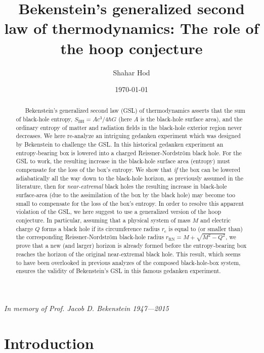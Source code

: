 \documentclass[12pt,preprintnumbers,amsmath,amssymbm,prd]{revtex4-1}
\begin{document}
\title{Bekenstein's generalized second law of thermodynamics: The
role of the hoop conjecture}
\author{Shahar Hod}
\address{The Ruppin Academic Center, Emeq Hefer 40250, Israel}
\address{ }
\address{The Hadassah Institute, Jerusalem 91010, Israel}
\date{\today}
{\it In memory of Prof. Jacob D. Bekenstein 1947---2015}

\begin{abstract}
\ \ \ Bekenstein's generalized second law (GSL) of thermodynamics
asserts that the sum of black-hole entropy,
$S_{\text{BH}}=Ac^3/4\hbar G$ (here $A$ is the black-hole surface
area), and the ordinary entropy of matter and radiation fields in
the black-hole exterior region never decreases. We here re-analyze
an intriguing gedanken experiment which was designed by Bekenstein
to challenge the GSL. In this historical gedanken experiment an
entropy-bearing box is lowered into a charged Reissner-Nordstr\"om
black hole. For the GSL to work, the resulting increase in the
black-hole surface area (entropy) must compensate for the loss of
the box's entropy. We show that {\it if} the box can be lowered
adiabatically all the way down to the black-hole horizon, as
previously assumed in the literature, then for {\it near-extremal}
black holes the resulting increase in black-hole surface-area (due
to the assimilation of the box by the black hole) may become too
small to compensate for the loss of the box's entropy. In order to
resolve this apparent violation of the GSL, we here suggest to use a
generalized version of the hoop conjecture. In particular, assuming
that a physical system of mass $M$ and electric charge $Q$ forms a
black hole if its circumference radius $r_{\text{c}}$ is equal to
(or smaller than) the corresponding Reissner-Nordstr\"om black-hole
radius $r_{\text{RN}}=M+\sqrt{M^2-Q^2}$, we prove that a new (and
larger) horizon is already formed before the entropy-bearing box
reaches the horizon of the original near-extremal black hole. This
result, which seems to have been overlooked in previous analyzes of
the composed black-hole-box system, ensures the validity of
Bekenstein's GSL in this famous gedanken experiment.
\end{abstract}
\bigskip
\maketitle

\section{Introduction}
\end{document}
